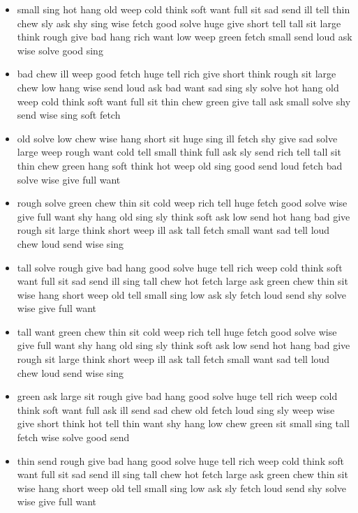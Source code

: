 \documentclass[11pt,a4wide]{article}
\begin{document}
\begin{itemize}
  \item small sing hot hang old weep cold think soft want full sit sad
    send ill tell thin chew sly ask shy sing wise fetch good solve
    huge give short tell tall sit large think rough give bad hang rich
    want low weep green fetch small send loud ask wise solve good sing

  \item bad chew ill weep good fetch huge tell rich give short think
    rough sit large chew low hang wise send loud ask bad want sad sing
    sly solve hot hang old weep cold think soft want full sit thin
    chew green give tall ask small solve shy send wise sing soft fetch

  \item old solve low chew wise hang short sit huge sing ill fetch shy
    give sad solve large weep rough want cold tell small think full
    ask sly send rich tell tall sit thin chew green hang soft think
    hot weep old sing good send loud fetch bad solve wise give full
    want

  \item rough solve green chew thin sit cold weep rich tell huge fetch
    good solve wise give full want shy hang old sing sly think soft
    ask low send hot hang bad give rough sit large think short weep
    ill ask tall fetch small want sad tell loud chew loud send wise
    sing

  \item tall solve rough give bad hang good solve huge tell rich weep
    cold think soft want full sit sad send ill sing tall chew hot
    fetch large ask green chew thin sit wise hang short weep old tell
    small sing low ask sly fetch loud send shy solve wise give full
    want

  \item tall want green chew thin sit cold weep rich tell huge fetch
    good solve wise give full want shy hang old sing sly think soft
    ask low send hot hang bad give rough sit large think short weep
    ill ask tall fetch small want sad tell loud chew loud send wise
    sing

  \item green ask large sit rough give bad hang good solve huge tell
    rich weep cold think soft want full ask ill send sad chew old
    fetch loud sing sly weep wise give short think hot tell thin want
    shy hang low chew green sit small sing tall fetch wise solve good
    send

  \item thin send rough give bad hang good solve huge tell rich weep
    cold think soft want full sit sad send ill sing tall chew hot
    fetch large ask green chew thin sit wise hang short weep old tell
    small sing low ask sly fetch loud send shy solve wise give full
    want


\end{itemize}
\end{document}
